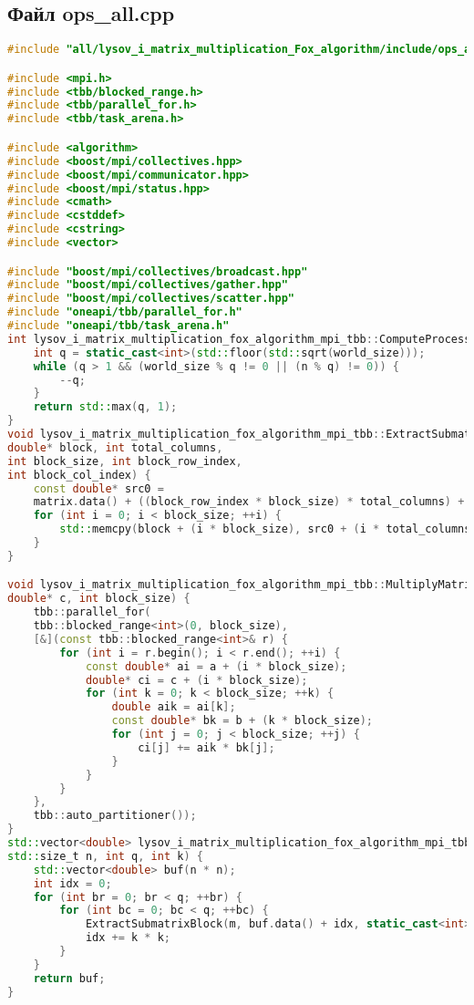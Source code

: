 \documentclass[12pt,a4paper]{extarticle}
\begin{document}
\subsection*{Файл ops\_all.cpp}
\begin{lstlisting}[language=C++]
#include "all/lysov_i_matrix_multiplication_Fox_algorithm/include/ops_all.hpp"

#include <mpi.h>
#include <tbb/blocked_range.h>
#include <tbb/parallel_for.h>
#include <tbb/task_arena.h>

#include <algorithm>
#include <boost/mpi/collectives.hpp>
#include <boost/mpi/communicator.hpp>
#include <boost/mpi/status.hpp>
#include <cmath>
#include <cstddef>
#include <cstring>
#include <vector>

#include "boost/mpi/collectives/broadcast.hpp"
#include "boost/mpi/collectives/gather.hpp"
#include "boost/mpi/collectives/scatter.hpp"
#include "oneapi/tbb/parallel_for.h"
#include "oneapi/tbb/task_arena.h"
int lysov_i_matrix_multiplication_fox_algorithm_mpi_tbb::ComputeProcessGrid(int world_size, std::size_t n) {
	int q = static_cast<int>(std::floor(std::sqrt(world_size)));
	while (q > 1 && (world_size % q != 0 || (n % q) != 0)) {
		--q;
	}
	return std::max(q, 1);
}
void lysov_i_matrix_multiplication_fox_algorithm_mpi_tbb::ExtractSubmatrixBlock(const std::vector<double>& matrix,
double* block, int total_columns,
int block_size, int block_row_index,
int block_col_index) {
	const double* src0 =
	matrix.data() + ((block_row_index * block_size) * total_columns) + (block_col_index * block_size);
	for (int i = 0; i < block_size; ++i) {
		std::memcpy(block + (i * block_size), src0 + (i * total_columns), block_size * sizeof(double));
	}
}

void lysov_i_matrix_multiplication_fox_algorithm_mpi_tbb::MultiplyMatrixBlocks(const double* a, const double* b,
double* c, int block_size) {
	tbb::parallel_for(
	tbb::blocked_range<int>(0, block_size),
	[&](const tbb::blocked_range<int>& r) {
		for (int i = r.begin(); i < r.end(); ++i) {
			const double* ai = a + (i * block_size);
			double* ci = c + (i * block_size);
			for (int k = 0; k < block_size; ++k) {
				double aik = ai[k];
				const double* bk = b + (k * block_size);
				for (int j = 0; j < block_size; ++j) {
					ci[j] += aik * bk[j];
				}
			}
		}
	},
	tbb::auto_partitioner());
}
std::vector<double> lysov_i_matrix_multiplication_fox_algorithm_mpi_tbb::ScatterMatrix(const std::vector<double>& m,
std::size_t n, int q, int k) {
	std::vector<double> buf(n * n);
	int idx = 0;
	for (int br = 0; br < q; ++br) {
		for (int bc = 0; bc < q; ++bc) {
			ExtractSubmatrixBlock(m, buf.data() + idx, static_cast<int>(n), k, br, bc);
			idx += k * k;
		}
	}
	return buf;
}


\end{lstlisting}
\end{document}
